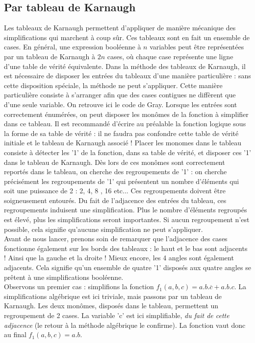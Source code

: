 \subsection{Par tableau de Karnaugh}
Les tableaux de Karnaugh permettent d'appliquer de manière mécanique des simplifications qui marchent à coup sûr. Ces tableaux sont en fait un ensemble de cases.
En général, une expression booléenne à $n$ variables peut être représentées par un tableau de Karnaugh à $2n$ cases, où chaque case représente une ligne d'une
table de vérité équivalente. Dans la méthode des tableaux de Karnaugh, il est nécessaire de disposer les entrées du tableaux d'une manière particulière : sans
cette disposition spéciale, la méthode ne peut s'appliquer. Cette manière particulière consiste à s'arranger afin que des cases contigues ne diffèrent que
d'une seule variable. On retrouve ici le code de Gray. Lorsque les entrées sont correctement énumérées, on peut disposer les monômes de la fonction à simplifier
dans ce tableau. Il est recommandé d'écrire au préalable la fonction logique sous la forme de sa table de vérité : il ne faudra pas confondre cette table de vérité initiale
et le tableau de Karnaugh associé ! Placer les monomes dans le tableau consiste à détecter les '1' de la fonction, dans sa table de vérité, et disposer ces '1' dans le tableau
de Karnaugh. Dès lors de ces monômes sont correctement reportés dans le tableau, on cherche des regroupements de '1' : on cherche précisément les regroupements
de '1' qui présentent un nombre d'éléments qui soit une puissance de 2 : 2, 4, 8 , 16 etc...  Ces regroupements doivent être soigneusement entourés. Du fait de l'adjacence des entrées du tableau, ces regroupements induisent
une simplification. Plus le nombre d'éléments regroupés est élevé, plus les simplifications seront importantes. Si aucun regroupement n'est possible, cela signifie qu'aucune simplification
ne peut s'appliquer.\\

Avant de nous lancer, prenons soin de remarquer que l'adjacence des cases fonctionne également sur les bords des tableaux : le haut et le bas sont adjacents ! Ainsi que la gauche et la droite ! Mieux encore,
les 4 angles sont également adjacents. Cela signifie qu'un ensemble de quatre '1' disposés aux quatre angles se prêtent à une simplifications booléenne.\\

Observons un premier cas : simplifions la fonction $f_1(a,b,c)=a.b.\overline{c}+a.b.c$. La simplifications algébrique est ici triviale, mais passons par un tableau de Karnaugh.
Les deux monômes, disposés dans le tableau, permettent un regroupement de 2 cases. La variable 'c' est ici simplifiable, {\it du fait de cette adjacence} (le retour à la méthode algébrique le confirme). La fonction
vaut donc au final $f_1(a,b,c)=a.b$.\\

